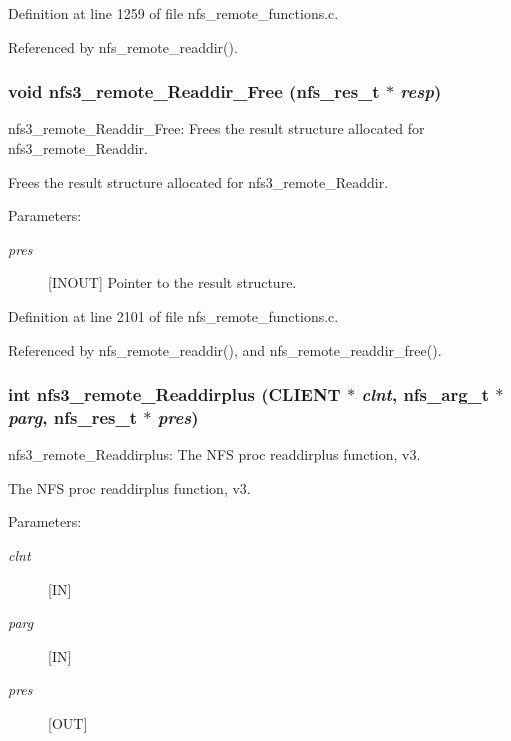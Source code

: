 Definition at line 1259 of file nfs\_\-remote\_\-functions.c.

Referenced by nfs\_\-remote\_\-readdir().
\subsubsection{\setlength{\rightskip}{0pt plus 5cm}void nfs3\_\-remote\_\-Readdir\_\-Free (nfs\_\-res\_\-t $\ast$ {\em resp})}\label{group__NFSprocs_ga87}


nfs3\_\-remote\_\-Readdir\_\-Free: Frees the result structure allocated for nfs3\_\-remote\_\-Readdir.

Frees the result structure allocated for nfs3\_\-remote\_\-Readdir.

\begin{Desc}
\item[Parameters:]
\begin{description}
\item[{\em pres}][INOUT] Pointer to the result structure. \end{description}
\end{Desc}


Definition at line 2101 of file nfs\_\-remote\_\-functions.c.

Referenced by nfs\_\-remote\_\-readdir(), and nfs\_\-remote\_\-readdir\_\-free().
\subsubsection{\setlength{\rightskip}{0pt plus 5cm}int nfs3\_\-remote\_\-Readdirplus (CLIENT $\ast$ {\em clnt}, nfs\_\-arg\_\-t $\ast$ {\em parg}, nfs\_\-res\_\-t $\ast$ {\em pres})}\label{group__NFSprocs_ga35}


nfs3\_\-remote\_\-Readdirplus: The NFS proc readdirplus function, v3.

The NFS proc readdirplus function, v3.

\begin{Desc}
\item[Parameters:]
\begin{description}
\item[{\em clnt}][IN] \item[{\em parg}][IN] \item[{\em pres}][OUT] \end{description}
\end{Desc}


